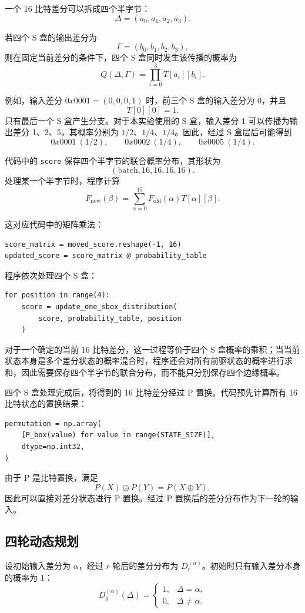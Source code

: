 一个 16 比特差分可以拆成四个半字节：
\[
    \Delta=(a_0,a_1,a_2,a_3).
\]

若四个 S 盒的输出差分为
\[
    \Gamma=(b_0,b_1,b_2,b_3),
\]
则在固定当前差分的条件下，四个 S 盒同时发生该传播的概率为
\[
    Q(\Delta,\Gamma)
    =
    \prod_{i=0}^{3}T[a_i][b_i].
\]

例如，输入差分 $0x0001=(0,0,0,1)$ 时，前三个 S 盒的输入差分为 0，并且
\[
    T[0][0]=1.
\]
只有最后一个 S 盒产生分支。对于本实验使用的 S 盒，输入差分 1 可以传播为输出差分 1、2、5，其概率分别为 $1/2$、$1/4$、$1/4$。因此，经过 S 盒层后可能得到
\[
    0x0001\ (1/2),\qquad
    0x0002\ (1/4),\qquad
    0x0005\ (1/4).
\]

代码中的 \texttt{score} 保存四个半字节的联合概率分布，其形状为
\[
    (\text{batch},16,16,16,16).
\]
处理某一个半字节时，程序计算
\[
    F_{\mathrm{new}}(\beta)
    =
    \sum_{\alpha=0}^{15}
    F_{\mathrm{old}}(\alpha)T[\alpha][\beta].
\]

这对应代码中的矩阵乘法：
\begin{lstlisting}
score_matrix = moved_score.reshape(-1, 16)
updated_score = score_matrix @ probability_table
\end{lstlisting}

程序依次处理四个 S 盒：
\begin{lstlisting}
for position in range(4):
    score = update_one_sbox_distribution(
        score, probability_table, position
    )
\end{lstlisting}

对于一个确定的当前 16 比特差分，这一过程等价于四个 S 盒概率的乘积；当当前状态本身是多个差分状态的概率混合时，程序还会对所有前驱状态的概率进行求和，因此需要保存四个半字节的联合分布，而不能只分别保存四个边缘概率。

四个 S 盒处理完成后，将得到的 16 比特差分经过 P 置换。代码预先计算所有 16 比特状态的置换结果：
\begin{lstlisting}
permutation = np.array(
    [P_box(value) for value in range(STATE_SIZE)],
    dtype=np.int32,
)
\end{lstlisting}

由于 P 是比特置换，满足
\[
    P(X)\oplus P(Y)=P(X\oplus Y),
\]
因此可以直接对差分状态进行 P 置换。经过 P 置换后的差分分布作为下一轮的输入。

\subsection{四轮动态规划}

设初始输入差分为 $\alpha$，经过 $r$ 轮后的差分分布为 $D_r^{(\alpha)}$。初始时只有输入差分本身的概率为 1：
\[
    D_0^{(\alpha)}(\Delta)=
    \begin{cases}
        1,&\Delta=\alpha,\\
        0,&\Delta\ne\alpha.
    \end{cases}
\]

